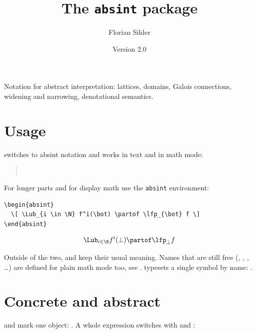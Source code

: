\documentclass[11pt,a4paper]{article}
\title{The \texttt{absint} package}
\author{Florian Sihler}
\date{Version 2.0}
\newcommand*\cs[1]{\blatex{\\#1}}
\newcommand*\opt[1]{\blatex{#1}}
\begin{document}
\maketitle

Notation for abstract interpretation: lattices, domains, Galois connections,
widening and narrowing, denotational semantics.

\section{Usage}

\cs{absexpr} switches to absint notation and works in text and in math mode:

\begin{quote}
  \\
\end{quote}

For longer parts and for display math use the \texttt{absint} environment:

\begin{verbatim}
\begin{absint}
  \[ \Lub_{i \in \N} f^i(\bot) \partof \lfp_{\bot} f \]
\end{absint}
\end{verbatim}
\begin{absint}
  \[ \Lub_{i \in \N} f^i(\bot) \partof \lfp_{\bot} f \]
\end{absint}

Outside of the two, \cs{lor} and \cs{sqcup} keep their usual meaning.  Names
that are still free (\cs{lub}, \cs{Environments}, \cs{Interval}, \dots) are
defined for plain math mode too, see \opt{stubs}.  
typesets a single symbol by name: .

\section{Concrete and abstract}

\cs{abstract} and \cs{concrete} mark one object:
.  A whole expression switches
with \cs{abstractly} and \cs{concretely}:
\end{document}
